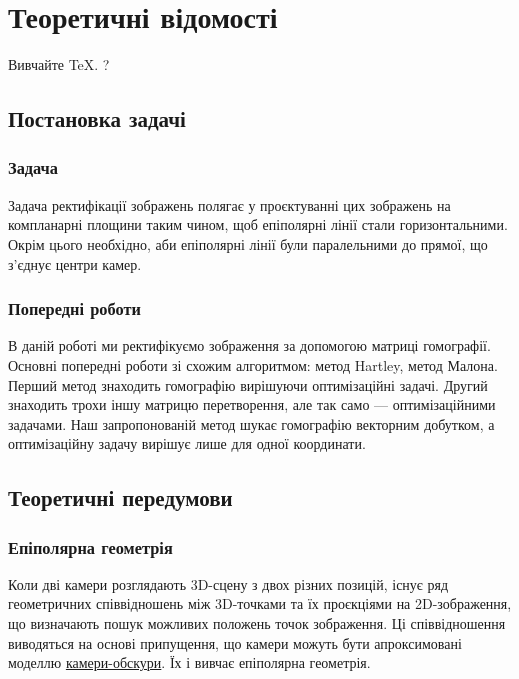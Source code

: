 \chapter{Теоретичні відомості}

Вивчайте \TeX \cite{Knuth:1984}.
?

\section{Постановка задачі}
\subsection{Задача}
Задача ректифікації зображень полягає у проєктуванні цих зображень на 
компланарні площини таким чином, щоб епіполярні лінії стали горизонтальними. 
Окрім цього необхідно, аби  епіполярні лінії були паралельними до прямої, що 
з'єднує центри камер.
\subsection{Попередні роботи}
В даній роботі ми ректифікуємо зображення за допомогою матриці гомографії. 
Основні попередні роботи зі схожим алгоритмом: 
метод Hartley\cite{DBLP:journals/ijcv/Hartley99}, 
метод Малона\cite{Mallon2005ProjectiveRF}. Перший метод знаходить гомографію
вирішуючи оптимізаційні задачі. Другий знаходить трохи іншу матрицю перетворення, 
але так само --- оптимізаційними задачами. Наш запропонованій метод шукає 
гомографію векторним добутком, а оптимізаційну задачу вирішує лише для одної 
координати.


\section{Теоретичні передумови}
\subsection{Епіполярна геометрія}
Коли дві камери розглядають 3D-сцену з двох різних позицій, існує ряд 
геометричних співвідношень між 3D-точками та їх проєкціями на 2D-зображення, 
що визначають пошук можливих положень точок зображення. Ці співвідношення 
виводяться на основі припущення, що камери можуть бути апроксимовані 
моделлю \href{https://en.wikipedia.org/wiki/Camera_obscura}{камери-обскури}. 
Їх і вивчає епіполярна геометрія. 

